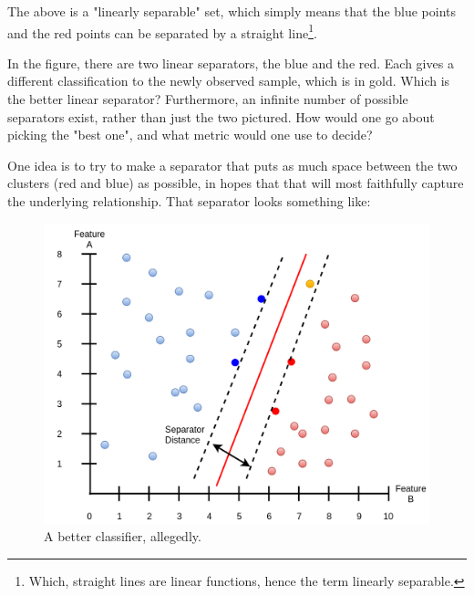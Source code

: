 \documentclass[a4paper, 12pt]{article}
\begin{document}
                        \par The above is a "linearly separable" set, which simply means that the blue points and the red points can be separated by a straight line\footnote{Which, straight lines are linear functions, hence the term linearly separable.}. 
                        
                        \par In the figure, there are two linear separators, the blue and the red. Each gives a different classification to the newly observed sample, which is in gold. Which is the better linear separator? Furthermore, an infinite number of possible separators exist, rather than just the two pictured. How would one go about picking the "best one", and what metric would one use to decide?
                        
                        \par One idea is to try to make a separator that puts as much space between the two clusters (red and blue) as possible, in hopes that that will most faithfully capture the underlying relationship. That separator looks something like:
                        
                        \begin{figure}[h]
                            \caption{A better classifier, allegedly.}
                            \centering
                            \includegraphics[width=\textwidth]{betterClassifier}
                        \end{figure} 
                        
\end{document}
